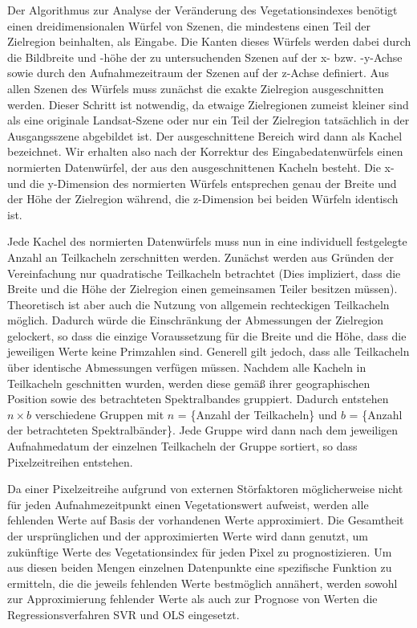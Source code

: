 Der Algorithmus zur Analyse der Veränderung des Vegetationsindexes benötigt einen dreidimensionalen Würfel von Szenen, die mindestens einen Teil der Zielregion beinhalten, als Eingabe. Die Kanten dieses Würfels werden dabei durch die Bildbreite und -höhe der zu untersuchenden Szenen auf der x- bzw. -y-Achse sowie durch den Aufnahmezeitraum der Szenen auf der z-Achse definiert. Aus allen Szenen des Würfels muss zunächst die exakte Zielregion ausgeschnitten werden. Dieser Schritt ist notwendig, da etwaige Zielregionen zumeist kleiner sind als eine originale Landsat-Szene oder nur ein Teil der Zielregion tatsächlich in der Ausgangsszene abgebildet ist. Der ausgeschnittene Bereich wird dann als Kachel bezeichnet. Wir erhalten also nach der Korrektur des Eingabedatenwürfels einen normierten Datenwürfel, der aus den ausgeschnittenen Kacheln besteht. Die x- und die y-Dimension des normierten Würfels entsprechen genau der Breite und der Höhe der Zielregion während, die z-Dimension bei beiden Würfeln identisch ist.

Jede Kachel des normierten Datenwürfels muss nun in eine individuell festgelegte Anzahl an Teilkacheln zerschnitten werden. Zunächst werden aus Gründen der Vereinfachung nur quadratische Teilkacheln betrachtet (Dies impliziert, dass die Breite und die Höhe der Zielregion einen gemeinsamen Teiler besitzen müssen). Theoretisch ist aber auch die Nutzung von allgemein rechteckigen Teilkacheln möglich. Dadurch würde die Einschränkung der Abmessungen der Zielregion gelockert, so dass die einzige Voraussetzung für die Breite und die Höhe, dass die jeweiligen Werte keine Primzahlen sind. Generell gilt jedoch, dass alle Teilkacheln über identische Abmessungen verfügen müssen. Nachdem alle Kacheln in Teilkacheln geschnitten wurden, werden diese gemäß ihrer geographischen Position sowie des betrachteten Spektralbandes gruppiert. Dadurch entstehen \(n \times b \) verschiedene Gruppen mit $n$ = \{Anzahl der Teilkacheln\} und $b$ = \{Anzahl der betrachteten Spektralbänder\}. Jede Gruppe wird dann nach dem jeweiligen Aufnahmedatum der einzelnen Teilkacheln der Gruppe sortiert, so dass Pixelzeitreihen entstehen. 

Da einer Pixelzeitreihe aufgrund von externen Störfaktoren möglicherweise nicht für jeden Aufnahmezeitpunkt einen Vegetationswert aufweist, werden alle fehlenden Werte auf Basis der vorhandenen Werte approximiert. Die Gesamtheit der ursprünglichen und der approximierten Werte wird dann genutzt, um zukünftige Werte des Vegetationsindex für jeden Pixel zu prognostizieren. Um aus diesen beiden Mengen einzelnen Datenpunkte eine spezifische Funktion zu ermitteln, die die jeweils fehlenden Werte bestmöglich annähert, werden sowohl zur Approximierung fehlender Werte als auch zur Prognose von Werten die Regressionsverfahren SVR und OLS eingesetzt. \\

